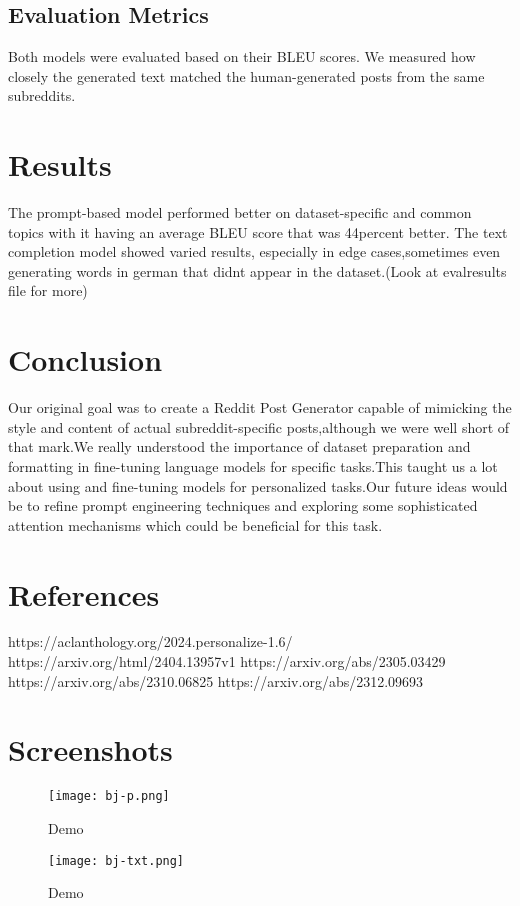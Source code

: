\documentclass{article}
\begin{document}
\subsection{Evaluation Metrics}
Both models were evaluated based on their BLEU scores. We measured how closely the generated text matched the human-generated posts from the same subreddits.

\section{Results}
The prompt-based model performed better on dataset-specific and common topics with it having an average BLEU score that was 44percent better. The text completion model showed varied results, especially in edge cases,sometimes even generating words in german that didnt appear in the dataset.(Look at evalresults file for more)

\section{Conclusion}

Our original goal was to create a Reddit Post Generator capable of mimicking the style and content of actual subreddit-specific posts,although we were well short of that mark.We really understood the importance of dataset preparation and formatting in fine-tuning language models for specific tasks.This taught us a lot about using and fine-tuning models for personalized tasks.Our future ideas would be to refine prompt engineering techniques and exploring some sophisticated attention mechanisms which could be beneficial for this task.

\section{References}

https://aclanthology.org/2024.personalize-1.6/
https://arxiv.org/html/2404.13957v1
https://arxiv.org/abs/2305.03429
https://arxiv.org/abs/2310.06825
https://arxiv.org/abs/2312.09693


\section{Screenshots}
\begin{figure}
    \centering
    \texttt{[image: bj-p.png]}
    \caption{Demo}
    \label{fig:enter-label}
\end{figure}

\begin{figure}
    \centering
    \texttt{[image: bj-txt.png]}
    \caption{Demo}
    \label{fig:enter-label}
\end{figure}
\end{document}
